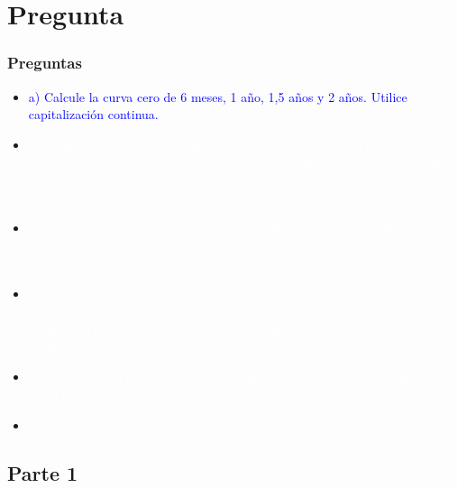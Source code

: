 \documentclass{beamer}
\begin{document}
\section{Pregunta }
  \begin{frame}
    \frametitle{Preguntas}
    \begin{itemize}
      \scriptsize
      \item {\Large\textcolor{blue}{a) Calcule la curva cero de 6 meses, 1 año, 1,5 años y 2 años. Utilice capitalización continua.}}
      \vspace{3pt}
      \item {\textcolor{white}{b) Grafique la curva cero y comente (sin realizar cálculos) si la pendiente de la curva de los bonos del BCCh (con cupones) es positiva o negativa. ¿Qué factor explica el \textit{spread} entre ambas curvas?, ¿por qué el \textit{spread} aumenta a mayor madurez?}}
      \vspace{3pt}
      \item {\textcolor{white}{c) Comente cuál es la interpretación económica detrás de la pendiente observada en la curva cero. ¿Qué nos dice respecto a la probabilidad de recesión?}}
      \vspace{3pt}
      \item {\textcolor{white}{d) Considerando que usted tiene la información de la curva cero, la curva \textit{forward} y la curva de las \textit{yields} de los bonos de gobierno. Señale qué curva usaría para calcular el valor presente de las ganancias o pérdidas de los contratos \textit{forward}.}}
      \vspace{3pt}
      \item {\textcolor{white}{e) ¿Cuál es el rol de las probabilidades neutrales al riesgo en d)?, ¿qué rol juega la condición de no arbitraje?}}
      \vspace{3pt}
      \item {\textcolor{white}{f) Calcule el punto a) utilizando matrices en Excel/R/Python.}}
      \vspace{3pt}
    \end{itemize}
  \end{frame}

\subsection{Parte 1}

\newcommand{\capcontinuacero}{ F = P \cdot e^{-rT}}
\newcommand{\capcontinua}{F = \sum_{i=1}^{n} \frac{C_i}{e^{r_i t_i}} + \frac{P}{e^{r_n t_n}}}
\end{document}
